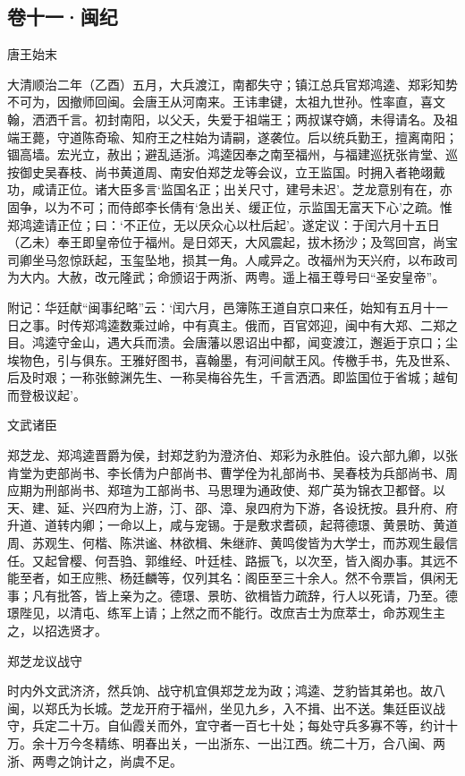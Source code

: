 \documentclass[]{article}
\begin{document}
\hypertarget{header-n67}{%
\subsection{卷十一·闽纪}\label{header-n67}}

唐王始末

大清顺治二年（乙酉）五月，大兵渡江，南都失守；镇江总兵官郑鸿逵、郑彩知势不可为，因撤师回闽。会唐王从河南来。王讳聿键，太祖九世孙。性率直，喜文翰，洒洒千言。初封南阳，以父夭，失爱于祖端王；两叔谋夺嫡，未得请名。及祖端王薨，守道陈奇瑜、知府王之柱始为请嗣，遂袭位。后以统兵勤王，擅离南阳；锢高墙。宏光立，赦出；避乱适浙。鸿逵因奉之南至福州，与福建巡抚张肯堂、巡按御史吴春枝、尚书黄道周、南安伯郑芝龙等会议，立王监国。时拥入者艳翊戴功，咸请正位。诸大臣多言`监国名正；出关尺寸，建号未迟'。芝龙意别有在，亦固争，以为不可；而侍郎李长倩有`急出关、缓正位，示监国无富天下心'之疏。惟郑鸿逵请正位；曰：`不正位，无以厌众心以杜后起'。遂定议：于闰六月十五日（乙未）奉王即皇帝位于福州。是日郊天，大风震起，拔木扬沙；及驾回宫，尚宝司卿坐马忽惊跃起，玉玺坠地，损其一角。人咸异之。改福州为天兴府，以布政司为大内。大赦，改元隆武；命颁诏于两浙、两粤。遥上福王尊号曰``圣安皇帝''。

附记：华廷献``闽事纪略''云：`闰六月，邑簿陈王道自京口来任，始知有五月十一日之事。时传郑鸿逵数乘过岭，中有真主。俄而，百官郊迎，闽中有大郑、二郑之目。鸿逵守金山，遇大兵而溃。会唐藩以恩诏出中都，闻变渡江，邂逅于京口；尘埃物色，引与俱东。王雅好图书，喜翰墨，有河间献王风。传檄手书，先及世系、后及时艰；一称张鲸渊先生、一称吴梅谷先生，千言洒洒。即监国位于省城；越旬而登极议起'。

文武诸臣

郑芝龙、郑鸿逵晋爵为侯，封郑芝豹为澄济伯、郑彩为永胜伯。设六部九卿，以张肯堂为吏部尚书、李长倩为户部尚书、曹学佺为礼部尚书、吴春枝为兵部尚书、周应期为刑部尚书、郑瑄为工部尚书、马思理为通政使、郑广英为锦衣卫都督。以天、建、延、兴四府为上游，汀、邵、漳、泉四府为下游，各设抚按。县升府、府升道、道转内卿；一命以上，咸与宠锡。于是敷求耆硕，起蒋德璟、黄景昉、黄道周、苏观生、何楷、陈洪谧、林欲楫、朱继祚、黄鸣俊皆为大学士，而苏观生最信任。又起曾樱、何吾驺、郭维经、叶廷桂、路振飞，以次至，皆入阁办事。其远不能至者，如王应熊、杨廷麟等，仅列其名：阁臣至三十余人。然不令票旨，俱闲无事；凡有批答，皆上亲为之。德璟、景昉、欲楫皆力疏辞，行人以死请，乃至。德璟陛见，以清屯、练军上请；上然之而不能行。改庶吉士为庶萃士，命苏观生主之，以招选贤才。

郑芝龙议战守

时内外文武济济，然兵饷、战守机宜俱郑芝龙为政；鸿逵、芝豹皆其弟也。故八闽，以郑氏为长城。芝龙开府于福州，坐见九乡，入不揖、出不送。集廷臣议战守，兵定二十万。自仙霞关而外，宜守者一百七十处；每处守兵多寡不等，约计十万。余十万今冬精练、明春出关，一出浙东、一出江西。统二十万，合八闽、两浙、两粤之饷计之，尚虞不足。
\end{document}
